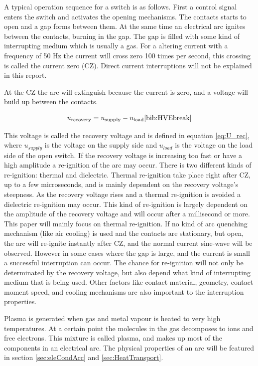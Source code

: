 \documentclass[10pt,a4paper,twoside]{article}
\begin{document}
A typical operation sequence for a switch is as follows. First a control signal enters the switch and activates the opening mechanisms. The contacts starts to open and a gap forms between them. At the same time an electrical arc ignites between the contacts, burning in the gap. The gap is filled with some kind of interrupting medium which is usually a gas. For a altering current with a frequency of 50 Hz the current will cross zero 100 times per second, this crossing is called the current zero (CZ). Direct current interruptions will not be explained in this report. 

At the CZ the arc will extinguish because the current is zero, and a voltage will build up between the contacts.

\begin{equation} \label{eq:U_rec}
u_\mathrm{{recovery}}=u_\mathrm{{supply}}-u_\mathrm{{load}} \cite{bib:HVEbreak}
\end{equation} 

 This voltage is called the recovery voltage and is defined in equation \eqref{eq:U_rec}, where $u_{supply}$ is the voltage on the supply side and $u_{load}$ is the voltage on the load side of the open switch. If the recovery voltage is increasing too fast or have a high amplitude a re-ignition of the arc may occur. There is two different kinds of re-ignition: thermal and dielectric. Thermal re-ignition take place right after CZ, up to a few microseconds, and is mainly dependent on the recovery voltage's steepness. As the recovery voltage rises and a thermal re-ignition is avoided a dielectric re-ignition may occur. This kind of re-ignition is largely dependent on the amplitude of the recovery voltage and will occur after a millisecond or more. This paper will mainly focus on thermal re-ignition. If no kind of arc quenching mechanism (like air cooling) is used and the contacts are stationary, but open, the arc will re-ignite instantly after CZ, and the normal current sine-wave will be observed. However in some cases where the gap is large, and the current is small a successful interruption can occur. The chance for re-ignition will not only be determinated by the recovery voltage, but also depend what kind of interrupting medium that is being used. Other factors like contact material, geometry, contact moment speed, and cooling mechanisms are also important to the interruption properties.

Plasma is generated when gas and metal vapour is heated to very high temperatures. At a certain point the molecules in the gas decomposes to ions and free electrons. This mixture is called plasma, and makes up most of the components in an electrical arc. The physical properties of an arc will be featured in section \ref{sec:eleCondArc} and \ref{sec:HeatTransport}. 
\end{document}
